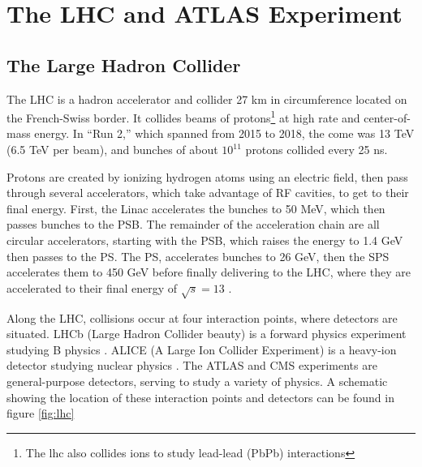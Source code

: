 \chapter{The LHC and ATLAS Experiment}
\section{The Large Hadron Collider}
The \gls{LHC} \cite{lhc} is a hadron accelerator and collider 27 km in circumference located on the French-Swiss border. It collides beams of protons\footnote{The lhc also collides ions to study lead-lead (PbPb) interactions} at high rate and center-of-mass energy. In ``Run 2,'' which spanned from 2015 to 2018, the \gls{come} was 13 TeV (6.5 TeV per beam), and bunches of about $10^{11}$ protons collided every 25 ns.

Protons are created by ionizing hydrogen atoms using an electric field, then pass through several accelerators, which take advantage of \gls{RF} cavities, to get to their final energy. First, the \gls{Linac} accelerates the bunches to 50 MeV, which then passes bunches to the \gls{PSB}. The remainder of the acceleration chain are all circular accelerators, starting with the \gls{PSB}, which raises the energy to 1.4 GeV then passes to the \gls{PS}. The \gls{PS}, accelerates bunches to 26 GeV, then the \gls{SPS} accelerates them to 450 GeV before finally delivering to the \gls{LHC}, where they are accelerated to their final energy of $\sqrt{s} = 13 $ \TeV.


Along the \gls{LHC}, collisions occur at four interaction points, where detectors are situated. LHCb (Large Hadron Collider beauty) is a forward physics experiment studying B physics \cite{lhcb}. ALICE (A Large Ion Collider Experiment) is a heavy-ion detector studying nuclear physics \cite{alice}. The ATLAS \cite{atlas-experiment} and \gls{CMS} \cite{cms} experiments are general-purpose detectors, serving to study a variety of physics. A schematic showing the location of these interaction points and detectors can be found in figure \ref{fig:lhc}

